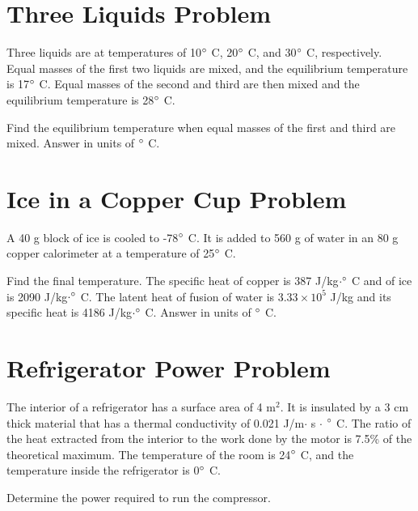 \documentclass[../physics12.tex]{subfiles}
\begin{document}
\section{Three Liquids Problem}
Three liquids are at temperatures of 10$\degree$ C, 20$\degree$ C, and 30$\degree$ C, respectively. Equal masses of the first two liquids are mixed, and the equilibrium temperature is 17$\degree$ C. Equal masses of the second and third are then mixed and the equilibrium temperature is 28$\degree$ C.

Find the equilibrium temperature when equal masses of the first and third are mixed. Answer in units of $\degree$ C.

\section{Ice in a Copper Cup Problem}
A 40 g block of ice is cooled to -78$\degree$ C. It is added to 560 g of water in an 80 g copper calorimeter at a temperature of 25$\degree$ C. 

Find the final temperature. The specific heat of copper is 387 J/kg$\cdot\degree$ C and of ice is 2090 J/kg$\cdot\degree$ C. The latent heat of fusion of water is $3.33\times 10^5$ J/kg 
and its specific heat is 4186 J/kg$\cdot\degree$ C. Answer in units of $\degree$ C.

\section{Refrigerator Power Problem}
The interior of a refrigerator has a surface area of 4 m$^2$. It is insulated by a 3 cm thick material that has a thermal conductivity of 0.021 J/m$\cdot$ s $\cdot$ $\degree$ C. The ratio of the heat 
extracted from the interior to the work done by the motor is 7.5\% of the theoretical maximum. The temperature of the room is 24$\degree$ C, and the temperature inside the refrigerator is 0$\degree$ C.

Determine the power required to run the compressor.
\end{document}
